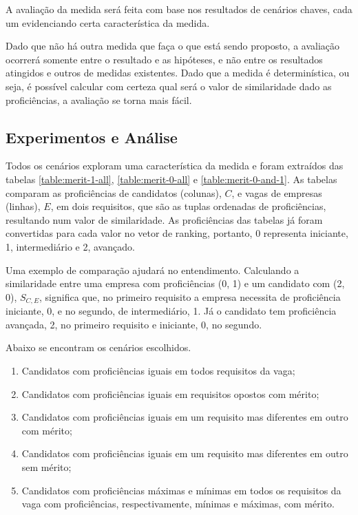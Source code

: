 \documentclass[preprint,12pt]{elsarticle}
\begin{document}
A avaliação da medida será feita com base nos resultados de cenários chaves, cada um evidenciando certa característica da medida. 

Dado que não há outra medida que faça o que está sendo proposto, a avaliação ocorrerá somente entre o resultado e as hipóteses, e não entre os resultados atingidos e outros de medidas existentes. Dado que a medida é determinística, ou seja, é possível calcular com certeza qual será o valor de similaridade dado as proficiências, a avaliação se torna mais fácil.

\subsection{Experimentos e Análise}
\label{ssec:experiments}

Todos os cenários exploram uma característica da medida e foram extraídos das tabelas \ref{table:merit-1-all}, \ref{table:merit-0-all} e \ref{table:merit-0-and-1}. As tabelas comparam as proficiências de candidatos  (colunas), $C$, e vagas de empresas (linhas), $E$, em dois requisitos, que são as tuplas ordenadas de proficiências, resultando num valor de similaridade. As proficiências das tabelas já foram convertidas para cada valor no vetor de ranking, portanto, 0 representa iniciante, 1, intermediário e 2, avançado. 

Uma exemplo de comparação ajudará no entendimento. Calculando a similaridade entre uma empresa com proficiências (0, 1) e um candidato com (2, 0), $S_{C,E}$, significa que, no primeiro requisito a empresa necessita de proficiência iniciante, 0, e no segundo, de intermediário, 1. Já o candidato tem proficiência avançada, 2, no primeiro requisito e iniciante, 0, no segundo. 

Abaixo se encontram os cenários escolhidos.

\begin{enumerate}
    \item Candidatos com proficiências iguais em todos requisitos da vaga;
    \item Candidatos com proficiências iguais em requisitos opostos com mérito;
    \item Candidatos com proficiências iguais em um requisito mas diferentes em outro com mérito;
    \item Candidatos com proficiências iguais em um requisito mas diferentes em outro sem mérito;
    \item Candidatos com proficiências máximas e mínimas em todos os requisitos da vaga com proficiências, respectivamente, mínimas e máximas, com mérito.
\end{enumerate}
\end{document}
